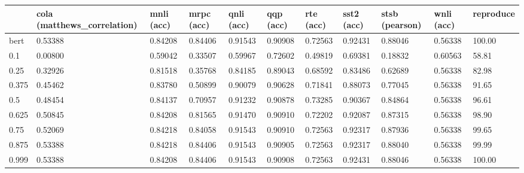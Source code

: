 \begin{tabular}{lllllllllll}
\toprule
{} & cola (matthews\_correlation) &        mnli (acc) &        mrpc (acc) &        qnli (acc) &         qqp (acc) &         rte (acc) &        sst2 (acc) &    stsb (pearson) &        wnli (acc) & reproduce \\
\midrule
bert                  &                     0.53388 &           0.84208 &           0.84406 &           0.91543 &           0.90908 &           0.72563 &           0.92431 &           0.88046 &           0.56338 &    100.00 \\
0.1                   &                     0.00800 &           0.59042 &           0.33507 &           0.59967 &           0.72602 &           0.49819 &           0.69381 &           0.18832 &           0.60563 &     58.81 \\
0.25                  &                     0.32926 &           0.81518 &           0.35768 &           0.84185 &           0.89043 &           0.68592 &           0.83486 &           0.62689 &           0.56338 &     82.98 \\
0.375                 &                     0.45462 &           0.83780 &           0.50899 &           0.90079 &           0.90628 &           0.71841 &           0.88073 &           0.77045 &           0.56338 &     91.65 \\
0.5                   &                     0.48454 &           0.84137 &           0.70957 &           0.91232 &           0.90878 &           0.73285 &           0.90367 &           0.84864 &           0.56338 &     96.61 \\
0.625                 &                     0.50845 &           0.84208 &           0.81565 &           0.91470 &           0.90910 &           0.72202 &           0.92087 &           0.87315 &           0.56338 &     98.90 \\
0.75                  &                     0.52069 &           0.84218 &           0.84058 &           0.91543 &           0.90910 &           0.72563 &           0.92317 &           0.87936 &           0.56338 &     99.65 \\
0.875                 &                     0.53388 &           0.84218 &           0.84406 &           0.91543 &           0.90905 &           0.72563 &           0.92317 &           0.88040 &           0.56338 &     99.99 \\
0.999                 &                     0.53388 &           0.84208 &           0.84406 &           0.91543 &           0.90908 &           0.72563 &           0.92431 &           0.88046 &           0.56338 &    100.00 \\

\end{tabular}
